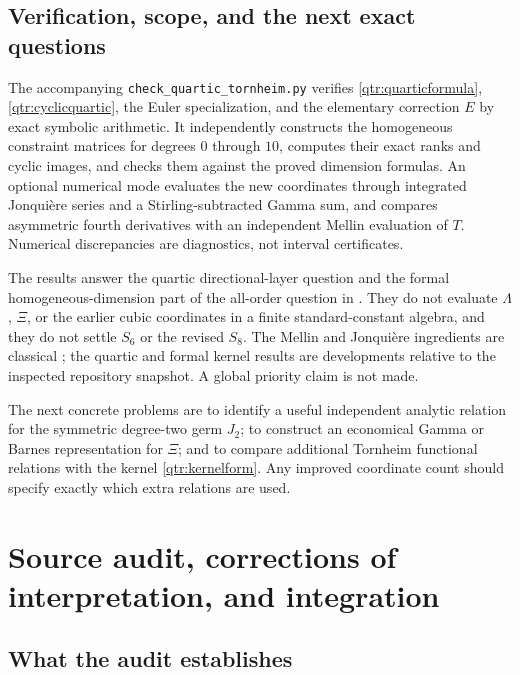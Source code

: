 \documentclass[11pt,a4paper]{article}
\numberwithin{equation}{section}
\theoremstyle{definition}
\theoremstyle{remark}
\begin{document}
\subsection{Verification, scope, and the next exact questions}

The accompanying \texttt{check\_quartic\_tornheim.py} verifies
\eqref{qtr:quarticformula}, \eqref{qtr:cyclicquartic},
the Euler specialization, and the elementary correction \(E\)
by exact symbolic arithmetic. It independently constructs the
homogeneous constraint matrices for degrees \(0\) through \(10\),
computes their exact ranks and cyclic images, and checks them
against the proved dimension formulas.
An optional numerical mode evaluates the new coordinates
through integrated Jonqui\`ere series and a Stirling-subtracted
Gamma sum, and compares asymmetric fourth derivatives with
an independent Mellin evaluation of \(T\). Numerical
discrepancies are diagnostics, not interval certificates.

The results answer the quartic directional-layer question and
the formal homogeneous-dimension part of the all-order
question in \cite{qtr:Independent}. They do not evaluate
\(\Lambda\), \(\Xi\), or the earlier cubic coordinates in
a finite standard-constant algebra, and they do not settle
\(S_6\) or the revised \(S_8\).
The Mellin and Jonqui\`ere ingredients are classical
\cite{DLMF}; the quartic and formal kernel results are
developments relative to the inspected repository snapshot.
A global priority claim is not made.

The next concrete problems are to identify a useful
independent analytic relation for the symmetric degree-two
germ \(J_2\); to construct an economical Gamma or Barnes
representation for \(\Xi\); and to compare additional
Tornheim functional relations with the kernel
\eqref{qtr:kernelform}. Any improved coordinate count should
specify exactly which extra relations are used.



\section{Source audit, corrections of interpretation, and integration}
\label{audit:section}

\subsection{What the audit establishes}
\end{document}
